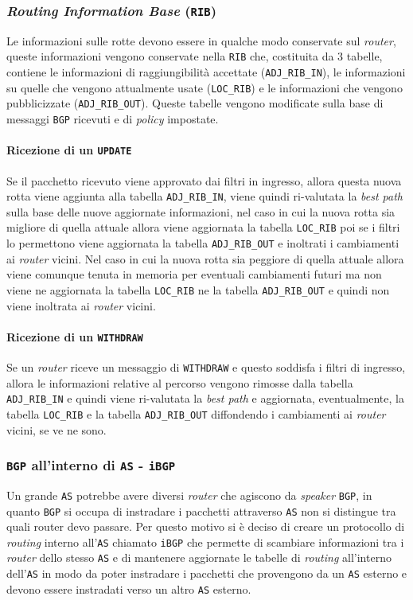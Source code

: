         \subsubsection{\textit{Routing Information Base} (\texttt{RIB})}
            Le informazioni sulle rotte devono essere in qualche modo conservate sul \textit{router}, queste informazioni vengono conservate nella \texttt{RIB} che, costituita da 3 tabelle, contiene le informazioni di raggiungibilità accettate (\texttt{ADJ\_RIB\_IN}), le informazioni su quelle che vengono attualmente usate (\texttt{LOC\_RIB}) e le informazioni che vengono pubblicizzate (\texttt{ADJ\_RIB\_OUT}). Queste tabelle vengono modificate sulla base di messaggi \texttt{BGP} ricevuti e di \textit{policy} impostate.
            \paragraph{Ricezione di un \texttt{UPDATE}} Se il pacchetto ricevuto viene approvato dai filtri in ingresso, allora questa nuova rotta viene aggiunta alla tabella \texttt{ADJ\_RIB\_IN}, viene quindi ri-valutata la \textit{best path} sulla base delle nuove aggiornate informazioni, nel caso in cui la nuova rotta sia migliore di quella attuale allora viene aggiornata la tabella \texttt{LOC\_RIB} poi se i filtri lo permettono viene aggiornata la tabella \texttt{ADJ\_RIB\_OUT} e inoltrati i cambiamenti ai \textit{router} vicini. Nel caso in cui la nuova rotta sia peggiore di quella attuale allora viene comunque tenuta in memoria per eventuali cambiamenti futuri ma non viene ne aggiornata la tabella \texttt{LOC\_RIB} ne la tabella \texttt{ADJ\_RIB\_OUT} e quindi non viene inoltrata ai \textit{router} vicini.
            \paragraph{Ricezione di un \texttt{WITHDRAW}} Se un \textit{router} riceve un messaggio di \texttt{WITHDRAW} e questo soddisfa i filtri di ingresso, allora le informazioni relative al percorso vengono rimosse dalla tabella \texttt{ADJ\_RIB\_IN} e quindi viene ri-valutata la \textit{best path} e aggiornata, eventualmente, la tabella \texttt{LOC\_RIB} e la tabella \texttt{ADJ\_RIB\_OUT} diffondendo i cambiamenti ai \textit{router} vicini, se ve ne sono.
        \subsubsection{\texttt{BGP} all'interno di \texttt{AS} - \texttt{iBGP}}
            Un grande \texttt{AS} potrebbe avere diversi \textit{router} che agiscono da \textit{speaker} \texttt{BGP}, in quanto \texttt{BGP} si occupa di instradare i pacchetti attraverso \texttt{AS} non si distingue tra quali router devo passare. Per questo motivo si è deciso di creare un protocollo di \textit{routing} interno all'\texttt{AS} chiamato \texttt{iBGP} che permette di scambiare informazioni tra i \textit{router} dello stesso \texttt{AS} e di mantenere aggiornate le tabelle di \textit{routing} all'interno dell'\texttt{AS} in modo da poter instradare i pacchetti che provengono da un \texttt{AS} esterno e devono essere instradati verso un altro \texttt{AS} esterno.
